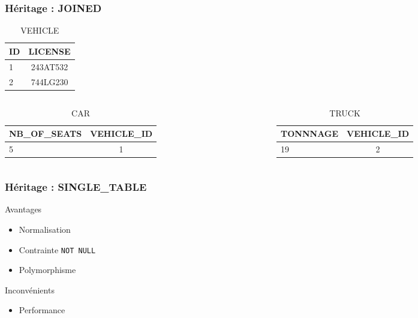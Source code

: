 \documentclass[t,12pt]{beamer}
\begin{document}
\begin{frame}
	\frametitle{H\'eritage : JOINED}

	\begin{table}
		\caption{VEHICLE}
		\begin{tabular}{l | c}
			ID & LICENSE \\
			\hline
			1 & 243AT532 \\
			2 & 744LG230 \\
		\end{tabular}
	\end{table}

	\begin{columns}
		\begin{column}{0.5\textwidth}
			\begin{table}
				\caption{CAR}
				\begin{tabular}{l | c }
					NB\_OF\_SEATS & VEHICLE\_ID \\
					\hline
					5 & 1
				\end{tabular}
		\end{table}
	\end{column}

		\begin{column}{0.5\textwidth}
			\begin{table}
				\caption{TRUCK}
				\begin{tabular}{l | c}
				TONNNAGE & VEHICLE\_ID \\
				\hline
				19 & 2
				\end{tabular}
			\end{table}
		\end{column}
	\end{columns}
\end{frame}

\begin{frame}
	\frametitle{H\'eritage : SINGLE\_TABLE}

	\begin{exampleblock}{Avantages}
		\begin{itemize}
			\item Normalisation
			\item Contrainte \lstinline{NOT NULL}
			\item Polymorphisme
		\end{itemize}
	\end{exampleblock}

	\begin{alertblock}{Inconv\'enients}
		\begin{itemize}
			\item Performance
		\end{itemize}
	\end{alertblock}
\end{frame}
\end{document}
